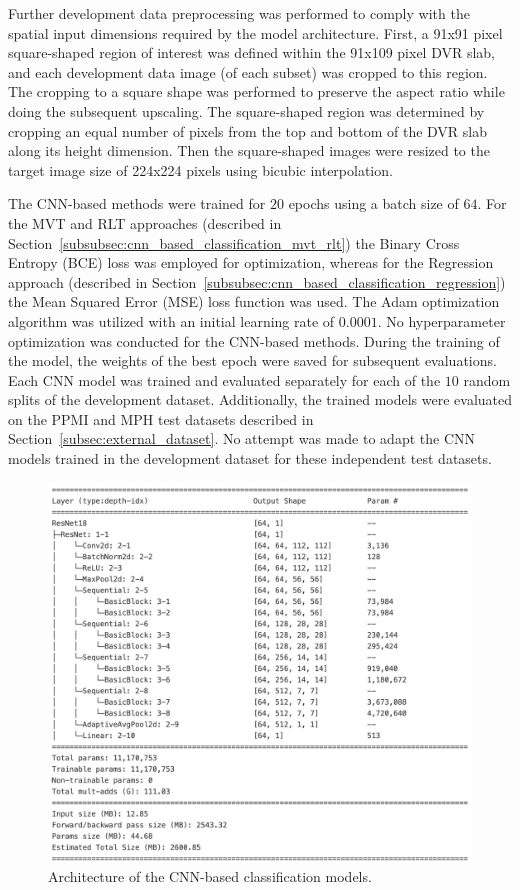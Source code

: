 Further development data preprocessing was performed to comply with the spatial input 
dimensions required by the model architecture.
First, a 91x91 pixel square-shaped region of interest was defined within the 91x109 pixel DVR slab, 
and each development data image (of each subset) was cropped to this region.
The cropping to a square shape was performed to preserve the aspect ratio while doing the subsequent upscaling.
The square-shaped region was determined by cropping an equal number of pixels from the top and bottom 
of the DVR slab along its height dimension.
Then the square-shaped images were resized to the target image size of 224x224 pixels using bicubic interpolation.

The CNN-based methods were trained for $20$ epochs using a batch size of $64$.
For the MVT and RLT approaches (described in Section~\ref{subsubsec:cnn_based_classification_mvt_rlt}) 
the Binary Cross Entropy (BCE) loss was employed for optimization, 
whereas for the Regression approach (described in Section~\ref{subsubsec:cnn_based_classification_regression}) 
the Mean Squared Error (MSE) loss function was used.
The Adam optimization algorithm was utilized with an initial learning rate of $0.0001$.
No hyperparameter optimization was conducted for the CNN-based methods.
During the training of the model, the weights of the best epoch were saved for subsequent evaluations.
Each CNN model was trained and evaluated separately for each of the $10$ random splits of the development dataset.
Additionally, the trained models were evaluated on the PPMI and MPH test datasets described in Section~\ref{subsec:external_dataset}.
No attempt was made to adapt the CNN models trained in the development dataset for these independent test datasets.

\begin{figure}[t]
  \centering
  \includegraphics[width=1.0\textwidth]{content/figures/cnn_architecture.png}
  \caption{Architecture of the CNN-based classification models.} 
  \label{fig:resnet}
\end{figure} 

